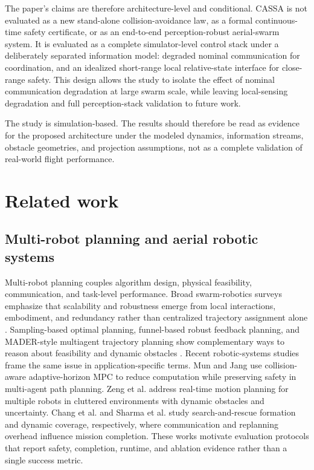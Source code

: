 \documentclass[11pt]{article}
\begin{document}
The paper's claims are therefore architecture-level and conditional. CASSA is not evaluated as a new stand-alone collision-avoidance law, as a formal continuous-time safety certificate, or as an end-to-end perception-robust aerial-swarm system. It is evaluated as a complete simulator-level control stack under a deliberately separated information model: degraded nominal communication for coordination, and an idealized short-range local relative-state interface for close-range safety. This design allows the study to isolate the effect of nominal communication degradation at large swarm scale, while leaving local-sensing degradation and full perception-stack validation to future work.

The study is simulation-based. The results should therefore be read as evidence for the proposed architecture under the modeled dynamics, information streams, obstacle geometries, and projection assumptions, not as a complete validation of real-world flight performance.

\section{Related work}

\subsection{Multi-robot planning and aerial robotic systems}

Multi-robot planning couples algorithm design, physical feasibility, communication, and task-level performance. Broad swarm-robotics surveys emphasize that scalability and robustness emerge from local interactions, embodiment, and redundancy rather than centralized trajectory assignment alone \cite{dorigo2021swarm,chung2018survey}. Sampling-based optimal planning, funnel-based robust feedback planning, and MADER-style multiagent trajectory planning show complementary ways to reason about feasibility and dynamic obstacles \cite{karaman2011sampling,majumdar2017funnel,tordesillas2022mader}. Recent robotic-systems studies frame the same issue in application-specific terms. Mun and Jang \cite{mun2026collision} use collision-aware adaptive-horizon MPC to reduce computation while preserving safety in multi-agent path planning. Zeng et al. \cite{zeng2026spfempc} address real-time motion planning for multiple robots in cluttered environments with dynamic obstacles and uncertainty. Chang et al. \cite{chang2026pomdp} and Sharma et al. \cite{sharma2026coverage} study search-and-rescue formation and dynamic coverage, respectively, where communication and replanning overhead influence mission completion. These works motivate evaluation protocols that report safety, completion, runtime, and ablation evidence rather than a single success metric.
\end{document}
